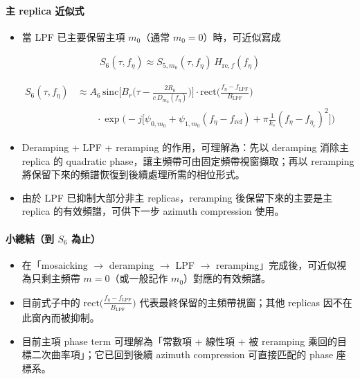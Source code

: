 \documentclass[10pt]{article}
\providecommand{\tightlist}{%
  \setlength{\itemsep}{0pt}\setlength{\parskip}{0pt}}
\begin{document}
\hypertarget{ux4e3b-replica-ux8fd1ux4f3cux5f0f-1}{%
\paragraph{主 replica
近似式}\label{ux4e3b-replica-ux8fd1ux4f3cux5f0f-1}}

\begin{itemize}
\tightlist
\item
  當 LPF 已主要保留主項 \(m_0\)（通常 \(m_0=0\)）時，可近似寫成
\end{itemize}

\begin{equation}
\begin{aligned}
S_6(\tau,f_\eta)\approx S_{5,m_0}(\tau,f_\eta)\,H_{\mathrm{re},f}(f_\eta)
\end{aligned}
\end{equation}

\begin{equation}
\begin{aligned}
S_6(\tau,f_\eta)
&\approx
A_6\,
\mathrm{sinc}\biggl[B_r\biggl(\tau-\frac{2R_0}{c\,D_{m_0}(f_\eta)}\biggr)\biggr]
\cdot \mathrm{rect}\biggl(\frac{f_\eta-f_{\mathrm{LPF}}}{B_{\mathrm{LPF}}}\biggr)\\
&\qquad \cdot
\exp\biggl(-j\biggl[\psi_{0,m_0}+\psi_{1,m_0}(f_\eta-f_{\mathrm{ref}})+\pi\frac{1}{k_s}(f_\eta-f_{\eta_c})^2\biggr]\biggr)
\end{aligned}
\end{equation}

\begin{itemize}
\tightlist
\item
  Deramping + LPF + reramping 的作用，可理解為：先以 deramping 消除主
  replica 的 quadratic phase，讓主頻帶可由固定頻帶視窗擷取；再以
  reramping 將保留下來的頻譜恢復到後續處理所需的相位形式。
\item
  由於 LPF 已抑制大部分非主 replicas，reramping 後保留下來的主要是主
  replica 的有效頻譜，可供下一步 azimuth compression 使用。
\end{itemize}

\hypertarget{ux5c0fux7e3dux7d50ux5230-s_6-ux70baux6b62}{%
\paragraph{\texorpdfstring{小總結（到 \(S_6\)
為止）}{小總結（到 S\_6 為止）}}\label{ux5c0fux7e3dux7d50ux5230-s_6-ux70baux6b62}}

\begin{itemize}
\tightlist
\item
  在「mosaicking \(\rightarrow\) deramping \(\rightarrow\) LPF
  \(\rightarrow\) reramping」完成後，可近似視為只剩主頻帶
  \(m=0\)（或一般記作 \(m_0\)）對應的有效頻譜。
\item
  目前式子中的
  \(\mathrm{rect}\biggl(\frac{f_\eta-f_{\mathrm{LPF}}}{B_{\mathrm{LPF}}}\biggr)\)
  代表最終保留的主頻帶視窗；其他 replicas 因不在此窗內而被抑制。
\item
  目前主項 phase term 可理解為「常數項 + 線性項 + 被 reramping
  乘回的目標二次曲率項」；它已回到後續 azimuth compression 可直接匹配的
  phase 座標系。
\end{itemize}
\end{document}
